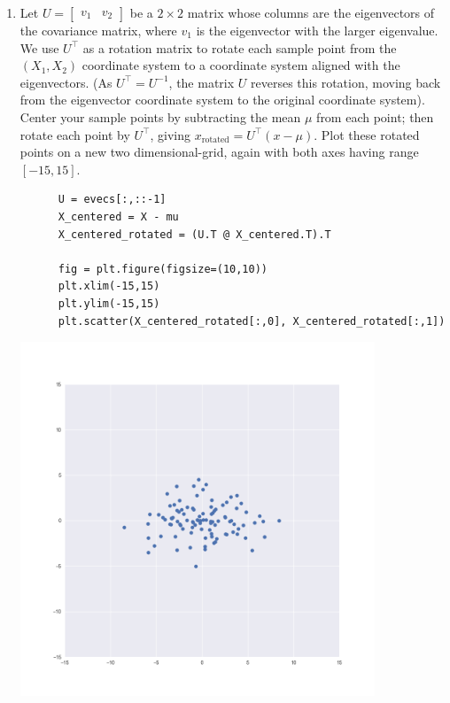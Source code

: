 \begin{enumerate}[label=(\alph*)]
\newpage
\item Let $U = \begin{bmatrix} v_1 & v_2 \end{bmatrix}$ be a $2 \times 2$
  matrix whose columns are the eigenvectors of the covariance matrix, where
  $v_1$ is the eigenvector with the larger eigenvalue. We use $U^{\top}$ as a
  rotation matrix to rotate each sample point from the $(X_1, X_2)$ coordinate
  system to a coordinate system aligned with the eigenvectors. (As
  $U^{\top} = U^{-1}$, the matrix $U$ reverses this rotation, moving back from
  the eigenvector coordinate system to the original coordinate system). Center
  your sample points by subtracting the mean $\mu$ from each point; then rotate
  each point by $U^{\top}$, giving $x_{\text{rotated}} = U^{\top}(x - \mu)$.
  Plot these rotated points on a new two dimensional-grid, again with both axes
  having range $[-15, 15]$.
  \begin{mdframed}
    \begin{verbatim}
      U = evecs[:,::-1]
      X_centered = X - mu
      X_centered_rotated = (U.T @ X_centered.T).T

      fig = plt.figure(figsize=(10,10))
      plt.xlim(-15,15)
      plt.ylim(-15,15)
      plt.scatter(X_centered_rotated[:,0], X_centered_rotated[:,1])
    \end{verbatim}
    \includegraphics[width=300pt]{img/hw03_3e.png}
  \end{mdframed}

\end{enumerate}

